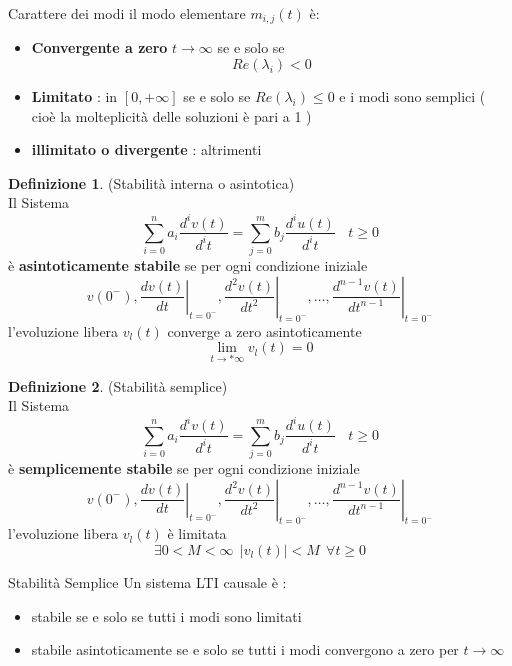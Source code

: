 \documentclass{article}
\theoremstyle{definition}
\newtheorem*{definizione}{Definizione}
\newcommand{\la}{\lambda}
\begin{document}
\begin{teo}{Carattere dei modi}{}
	il modo elementare $m_{i,j}(t)$ è: 
	\begin{itemize}
		\item \textbf{Convergente a zero} 
		$t \rightarrow \infty$ se e solo se $$Re(\la_i)<0$$
		\item  \textbf{Limitato} : in $[0,+\infty]$ se e solo se $Re(\la_i)\leq0$ e i modi sono semplici ( cioè la molteplicità delle soluzioni è pari a 1 ) 
		\item \textbf{illimitato o divergente } : altrimenti  
	
		\end{itemize}
	\end{teo}
	\begin{definizione}(Stabilità interna o asintotica)\\
		Il Sistema $$\sum_{i=0}^{n}a_i \frac{d^i v(t)}{d^it}=\sum_{j=0}^{m}b_j \frac{d^i u(t)}{d^it}  \ \ \ \ t \geq 0	$$ è \textbf{asintoticamente stabile } se per ogni condizione iniziale $$v\left(0^{-}\right),\left.\frac{d v(t)}{d t}\right|_{t=0^{-}},\left.\frac{d^2 v(t)}{d t^2}\right|_{t=0^{-}}, \ldots,\left.\frac{d^{n-1} v(t)}{d t^{n-1}}\right|_{t=0^{-}}
		$$ l'evoluzione libera $v_l(t)$ converge a zero asintoticamente 
		$$\lim_{t \rightarrow *\infty }v_l(t)=0$$
	\end{definizione}
	\begin{definizione}(Stabilità semplice) \\
		Il Sistema $$\sum_{i=0}^{n}a_i \frac{d^i v(t)}{d^it}=\sum_{j=0}^{m}b_j \frac{d^i u(t)}{d^it}  \ \ \ \ t \geq 0	$$ è \textbf{semplicemente  stabile } se per ogni condizione iniziale $$v\left(0^{-}\right),\left.\frac{d v(t)}{d t}\right|_{t=0^{-}},\left.\frac{d^2 v(t)}{d t^2}\right|_{t=0^{-}}, \ldots,\left.\frac{d^{n-1} v(t)}{d t^{n-1}}\right|_{t=0^{-}}
		$$ l'evoluzione libera $v_l(t)$ è limitata 
	$$\exists 0<M < \infty \ \  |v_l(t)|<M \ \ \forall t \geq 0$$
	\end{definizione}
	\begin{teo}{Stabilità Semplice }{}
	Un sistema LTI causale  è :
	\begin{itemize}
	\item stabile se e solo se tutti i modi sono limitati 
	\item stabile asintoticamente se e solo se tutti i modi convergono a zero per $t \rightarrow \infty$
	\end{itemize}
	\end{teo}
\end{document}
